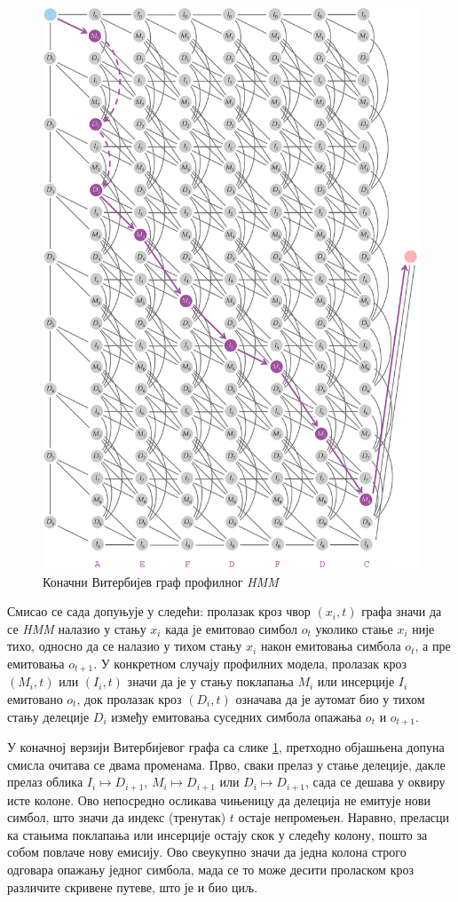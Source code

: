 \documentclass[12pt,oneside]{memoir}
\begin{document}
\begin{CJK}{UTF8}{ipxm}
\begin{figure}[H]
  \centering
  \includegraphics[width=.85\textwidth]{prof_vit2.png}
  \caption{Коначни Витербијев граф профилног \textit{HMM}\cite{compeau2015}}
  \label{fig:prof_vit2}
\end{figure}

Смисао се сада допуњује у следећи: пролазак кроз чвор $(x_i, t)$ графа значи да се \textit{HMM} налазио у стању $x_i$ када је емитовао симбол $o_t$ уколико стање $x_i$ није тихо, односно да се налазио у тихом стању $x_i$ након емитовања симбола $o_t$, а пре емитовања $o_{t+1}$. У конкретном случају профилних модела, пролазак кроз $(M_i, t)$ или $(I_i, t)$ значи да је у стању поклапања $M_i$ или инсерције $I_i$ емитовано $o_t$, док пролазак кроз $(D_i, t)$ означава да је аутомат био у тихом стању делеције $D_i$ између емитовања суседних симбола опажања $o_t$ и $o_{t+1}$.

У коначној верзији Витербијевог графа са слике \ref{fig:prof_vit2}, претходно објашњена допуна смисла очитава се двама променама. Прво, сваки прелаз у стање делеције, дакле прелаз облика $I_i \mapsto D_{i+1}$, $M_i \mapsto D_{i+1}$ или $D_i \mapsto D_{i+1}$, сада се дешава у оквиру исте колоне. Ово непосредно осликава чињеницу да делеција не емитује нови симбол, што значи да индекс (тренутак) $t$ остаје непромењен. Наравно, преласци ка стањима поклапања или инсерције остају скок у следећу колону, пошто за собом повлаче нову емисију. Ово свеукупно значи да једна колона строго одговара опажању једног симбола, мада се то може десити проласком кроз различите скривене путеве, што је и био циљ.


\end{CJK}
\end{document}
